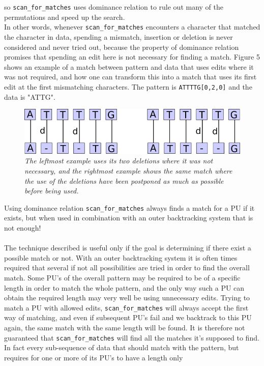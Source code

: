 \documentclass[12pt]{article}
\newcommand{\scm}{\texttt{scan\_for\_matches} }
\newcommand{\pu}{PU }
\newcommand{\pus}{PU's }
\begin{document}
so \scm uses dominance relation to rule out many of the permutations and speed up the search. \\
In other words, whenever \scm
encounters a character that matched the character in data, spending a mismatch, insertion or deletion is never
considered and never tried out, because the property of dominance relation promises that spending an edit
here is not necessary for finding a match. 
Figure 5 shows an example of a match between pattern and data that uses edits where it was not required,
and how one can transform this into a match that uses its first edit at the first mismatching characters.
The pattern is \texttt{ATTTTG[0,2,0]} and the data is "ATTG".
\begin{figure}[H]
\begin{center}
\includegraphics[scale=0.6]{Diagrams/shunt.png}
\end{center}
\caption{\textit{The leftmost example uses its two deletions where it was not necessary, and the rightmost example shows
the same match where the use of the deletions have been postponed as much as possible before being used.}}
\end{figure}
\noindent Using dominance relation \scm always finds a match for a \pu if it exists, but when used in combination
with an outer backtracking system that is not enough! \\ \\
The technique described is useful only if the goal is determining if there exist a possible match or not.
With an outer backtracking system it is often times required that several if not all possibilities are tried in
order to find the overall match. Some \pus of the overall pattern may be required to be of a specific length in order to
match the whole pattern, and the only way such a \pu can obtain the required length may very well be using unnecessary
edits. Trying to match a \pu with allowed edits, \scm will always accept the first way of matching, and even if
subsequent \pus fail and we backtrack to this \pu again, the same match with the same length will be found. 
It is therefore not guaranteed that \scm will find all the matches it's supposed to find. In fact every sub-sequence
of data that should match with the pattern, but requires for one or more of its \pus to have a length only
\end{document}

